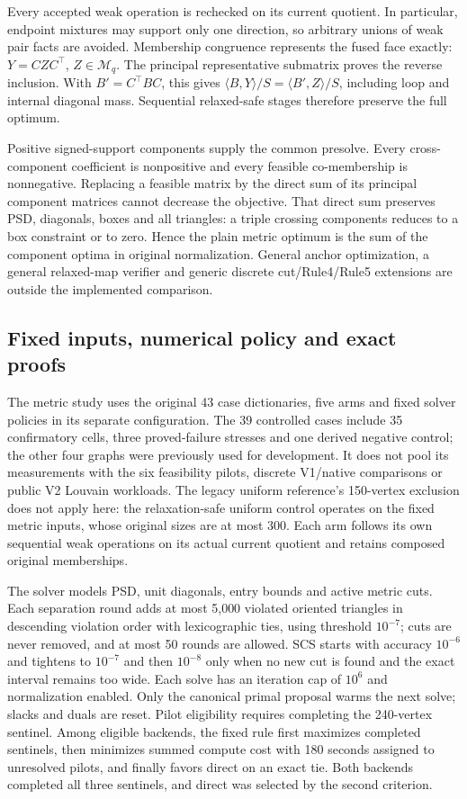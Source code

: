 \documentclass[sigconf,anonymous,review]{acmart}
\newcommand{\1}{\mathbf{1}}
\begin{document}
Every accepted weak operation is rechecked on its current quotient. In
particular, endpoint mixtures may support only one direction, so arbitrary
unions of weak pair facts are avoided. Membership congruence represents the
fused face exactly: $Y=CZC^\top$, $Z\in\mathcal M_q$. The principal
representative submatrix proves the reverse inclusion. With
$B'=C^\top BC$, this gives
$\langle B,Y\rangle/S=\langle B',Z\rangle/S$, including loop and internal
diagonal mass. Sequential relaxed-safe stages therefore preserve the full
optimum.

Positive signed-support components supply the common presolve. Every
cross-component coefficient is nonpositive and every feasible co-membership
is nonnegative. Replacing a feasible matrix by the direct sum of its principal
component matrices cannot decrease the objective. That direct sum preserves
PSD, diagonals, boxes and all triangles: a triple crossing components reduces
to a box constraint or to zero. Hence the plain metric optimum is the sum of
the component optima in original normalization. General anchor optimization,
a general relaxed-map verifier and generic discrete cut/Rule4/Rule5 extensions
are outside the implemented comparison.

\subsection{Fixed inputs, numerical policy and exact proofs}
The metric study uses the original 43 case dictionaries, five arms and fixed
solver policies in its separate configuration. The 39 controlled cases
include 35 confirmatory cells, three proved-failure stresses and one derived
negative control; the other four graphs were previously used for development.
It does not pool its measurements with the six feasibility pilots, discrete
V1/native comparisons or public V2 Louvain workloads. The legacy uniform
reference's 150-vertex exclusion does not apply here: the relaxation-safe
uniform control operates on the fixed metric inputs, whose original sizes
are at most 300. Each arm follows its own sequential weak operations on its
actual current quotient and retains composed original memberships.

The solver models PSD, unit diagonals, entry bounds and active metric cuts.
Each separation round adds at most 5,000 violated oriented triangles in
descending violation order with lexicographic ties, using threshold $10^{-7}$;
cuts are never removed, and at most 50 rounds are allowed. SCS starts with
accuracy $10^{-6}$ and tightens to $10^{-7}$ and then $10^{-8}$ only when no
new cut is found and the exact interval remains too wide. Each solve has an
iteration cap of $10^6$ and normalization enabled. Only the canonical primal
proposal warms the next solve; slacks and duals are reset. Pilot eligibility
requires completing the 240-vertex sentinel. Among eligible backends, the
fixed rule first maximizes completed sentinels, then minimizes summed compute
cost with 180 seconds assigned to unresolved pilots, and finally favors direct
on an exact tie. Both backends completed all three sentinels, and direct was
selected by the second criterion.
\end{document}
